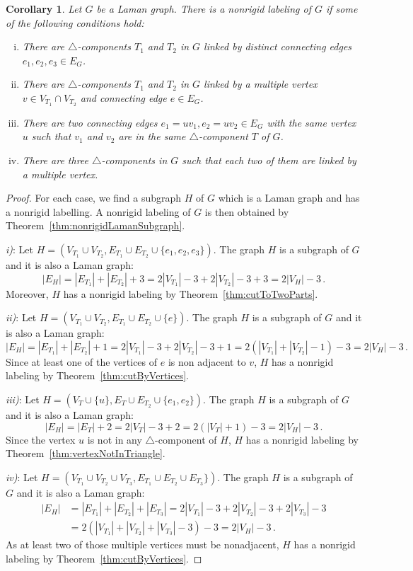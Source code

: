 \documentclass[a4paper, 11pt]{article}
\newcommand{\trcomp}{$\triangle$-component}
\newcommand{\trcomps}{$\triangle$-components}
\newtheorem{cor}[thm]{Corollary}
\theoremstyle{definition}
\begin{document}
\begin{cor}
\label{cor:LamanSubgraphs}
Let $G$ be a Laman graph. There is a nonrigid labeling of $G$ if some of the following conditions hold:
\begin{enumerate}[i)]
	\item There are \trcomps{} $T_1$ and $T_2$ in $G$ linked by distinct connecting edges $e_1, e_2,e_3\in E_G$.
	\item There are \trcomps{} $T_1$ and $T_2$ in $G$ linked by a multiple vertex $v\in V_{T_1}\cap V_{T_2}$ and connecting edge $e\in E_G$.
	\item There are two connecting edges $e_1=uv_1,e_2=uv_2\in E_G$ with the same vertex $u$ such that $v_1$ and $v_2$ are in the same \trcomp{} $T$ of $G$.
	\item There are three \trcomps{} in $G$ such that each two of them are linked by a multiple vertex.
\end{enumerate}
\end{cor}
\begin{proof}
For each case, we find a subgraph $H$ of $G$ which is a Laman graph and has a nonrigid labelling. A nonrigid labeling of $G$ is then obtained by Theorem~\ref{thm:nonrigidLamanSubgraph}.

\textit{i)}: Let $H=(V_{T_1}\cup V_{T_2},E_{T_1}\cup E_{T_2} \cup \{e_1,e_2,e_3\})$. The graph $H$ is a subgraph of $G$ and it is also a Laman graph:
$$
|E_H|=|E_{T_1}| + |E_{T_2}|+3=2|V_{T_1}|-3 +2|V_{T_2}|-3+3=2|V_H|-3\,.
$$
Moreover, $H$ has a nonrigid labeling by Theorem~\ref{thm:cutToTwoParts}.

\textit{ii)}: Let $H=(V_{T_1}\cup V_{T_2},E_{T_1}\cup E_{T_2} \cup \{e\})$. The graph $H$ is a subgraph of $G$ and it is also a Laman graph:
$$
|E_H|=|E_{T_1}| + |E_{T_2}|+1=2|V_{T_1}|-3 +2|V_{T_2}|-3+1=2(|V_{T_1}| +|V_{T_2}| -1)-3= 2|V_H|-3\,.
$$
Since at least one of the vertices of $e$ is non adjacent to $v$, $H$ has a nonrigid labeling by Theorem~\ref{thm:cutByVertices}.

\textit{iii)}: Let $H=(V_{T}\cup \{u\},E_{T}\cup E_{T_2} \cup \{e_1,e_2\})$. The graph $H$ is a subgraph of $G$ and it is also a Laman graph:
$$
|E_H|=|E_{T}|+2=2|V_{T}|-3 +2=2(|V_{T}|+1)-3 =2|V_H|-3\,.
$$
Since the vertex $u$ is not in any \trcomp{} of $H$, $H$ has a nonrigid labeling by Theorem~\ref{thm:vertexNotInTriangle}.

\textit{iv)}: Let $H=(V_{T_1}\cup V_{T_2}\cup V_{T_3},E_{T_1}\cup E_{T_2}\cup E_{T_3}\})$. The graph $H$ is a subgraph of $G$ and it is also a Laman graph:
\begin{align*}
|E_H|&=|E_{T_1}| + |E_{T_2}|+|E_{T_3}|=2|V_{T_1}|-3 +2|V_{T_2}|-3+2|V_{T_3}|-3 \\
&=2(|V_{T_1}| +|V_{T_2}| +|V_{T_3}|-3)-3= 2|V_H|-3\,.
\end{align*}
As at least two of those multiple vertices must be nonadjacent, $H$ has a nonrigid labeling by Theorem~\ref{thm:cutByVertices}.
\end{proof}
\end{document}
